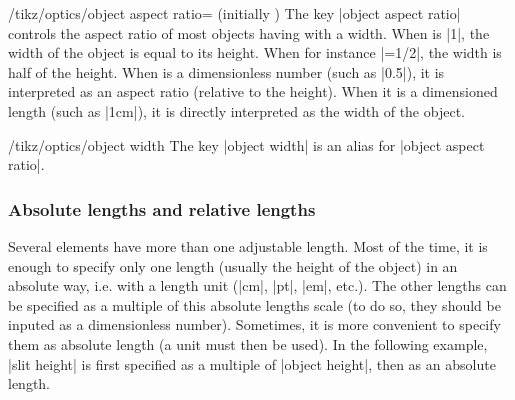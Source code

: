 \documentclass[a4paper]{ltxdoc}
\begin{document}
\begin{key}{/tikz/optics/object aspect ratio= (initially )}
    The key |object aspect ratio| controls the aspect ratio of most objects having with a width. When  is |1|, the width of the object is equal to its height.
    When for instance |=1/2|, the width is half of the height.
    When  is a dimensionless number (such as |0.5|), it is interpreted as an aspect ratio (relative to the height).
    When it is a dimensioned length (such as |1cm|), it is directly interpreted as the width of the object.

\begin{codeexample}[width=5cm]
\end{codeexample}
\end{key}

\begin{stylekey}{/tikz/optics/object width}
    The key |object width| is an alias for |object aspect ratio|.
\end{stylekey}

\subsubsection{Absolute lengths and relative lengths}

Several elements have more than one adjustable length. Most of the time, it is enough to specify only one length (usually the height of the object) in an absolute way, i.e. with a length unit (|cm|, |pt|, |em|, etc.). The other lengths can be specified as a multiple of this absolute lengths scale (to do so, they should be inputed as a dimensionless number). Sometimes, it is more convenient to specify them as absolute length (a unit must then be used). In the following example, |slit height| is first specified as a multiple of |object height|, then as an absolute length.

\begin{codeexample}[width=6cm]
\end{codeexample}
\end{document}
